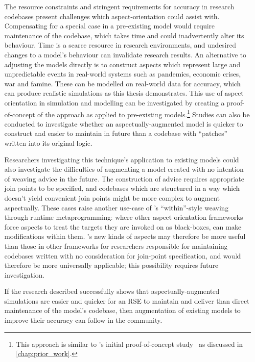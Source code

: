 The resource constraints and stringent requirements for accuracy in research
codebases present challenges which aspect-orientation could assist with.
Compensating for a special case in a pre-existing model would require
maintenance of the codebase, which takes time and could inadvertently alter its
behaviour. Time is a scarce resource in research environments, and undesired
changes to a model's behaviour can invalidate research results. An alternative
to adjusting the models directly is to construct aspects which represent large
and unpredictable events in real-world systems such as pandemics, economic
crises, war and famine. These can be modelled on real-world data for accuracy,
which can produce realistic simulations as this thesis demonstrates. This use of
aspect orientation in simulation and modelling can be investigated by creating a
proof-of-concept of the approach as applied to pre-existing
models.\footnote{This approach is similar to \pdsf{}'s initial proof-of-concept
study~\cite{wallis2018caise} as discussed in \cref{chap:prior_work}.} Studies
can also be conducted to investigate whether an aspectually-augmented model is
quicker to construct and easier to maintain in future than a codebase with
``patches'' written into its original logic.

Researchers investigating this technique's application to existing models could
also investigate the difficulties of augmenting a model created with no
intention of weaving advice in the future. The construction of advice requires
appropriate join points to be specified, and codebases which are structured in a
way which doesn't yield convenient join points might be more complex to augment
aspectually. These cases raise another use-case of \pdsf{}'s ``within''-style
weaving through runtime metaprogramming: where other aspect orientation
frameworks force aspects to treat the targets they are invoked on as
black-boxes, \pdsf can make modifications within them. \pdsf{}'s new kinds of
aspects may therefore be more useful than those in other frameworks for
researchers responsible for maintaining codebases written with no consideration
for join-point specification, and would therefore be more universally
applicable; this possibility requires future investigation.

If the research described successfully shows that aspectually-augmented
simulations are easier and quicker for an RSE to maintain and deliver than
direct maintenance of the model's codebase, then augmentation of existing models
to improve their accuracy can follow in the community. 
    
